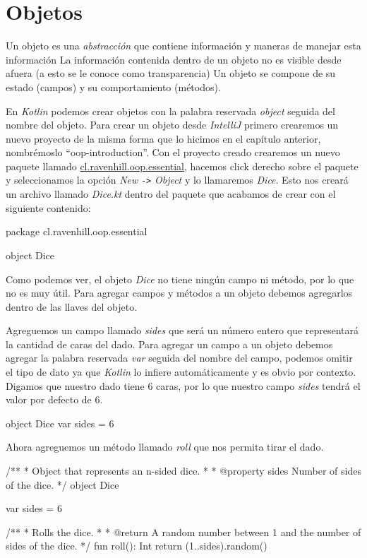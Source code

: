 \section{Objetos}
  Un objeto es una \textit{abstracción} que contiene información y maneras de manejar esta información
  La información contenida dentro de un objeto no es visible desde afuera (a esto se le conoce como transparencia)
  Un objeto se compone de su estado (campos) y su comportamiento (métodos).

  En \textit{Kotlin} podemos crear objetos con la palabra reservada \textit{object} seguida del 
  nombre del objeto.
  Para crear un objeto desde \textit{IntelliJ} primero crearemos un nuevo proyecto de la misma forma
  que lo hicimos en el capítulo anterior, nombrémoslo \enquote{oop-introduction}.
  Con el proyecto creado crearemos un nuevo paquete llamado \url{cl.ravenhill.oop.essential}, 
  hacemos click derecho sobre el paquete y seleccionamos la opción \textit{New} \texttt{->} 
  \textit{Object} y lo llamaremos \textit{Dice}.
  Esto nos creará un archivo llamado \textit{Dice.kt} dentro del paquete que acabamos de crear con
  el siguiente contenido:

  \begin{kotlin}
    package cl.ravenhill.oop.essential

    object Dice {
    }
  \end{kotlin}

  Como podemos ver, el objeto \textit{Dice} no tiene ningún campo ni método, por lo que no es muy
  útil.
  Para agregar campos y métodos a un objeto debemos agregarlos dentro de las llaves del objeto.

  Agreguemos un campo llamado \textit{sides} que será un número entero que representará la cantidad
  de caras del dado.
  Para agregar un campo a un objeto debemos agregar la palabra reservada \textit{var} seguida del
  nombre del campo, podemos omitir el tipo de dato ya que \textit{Kotlin} lo infiere 
  automáticamente y es obvio por contexto.
  Digamos que nuestro dado tiene 6 caras, por lo que nuestro campo \textit{sides} tendrá el valor
  por defecto de 6.

  \begin{kotlin}
    object Dice {
      var sides = 6
    }
  \end{kotlin}

  Ahora agreguemos un método llamado \textit{roll} que nos permita tirar el dado.

  \begin{kotlin}
    /**
     * Object that represents an n-sided dice.
     * 
     * @property sides Number of sides of the dice.
     */
    object Dice {
      var sides = 6

      /**
       * Rolls the dice.
       * 
       * @return A random number between 1 and the number of sides of the dice.
       */
      fun roll(): Int {
        return (1..sides).random()
      }
    }
  \end{kotlin}

